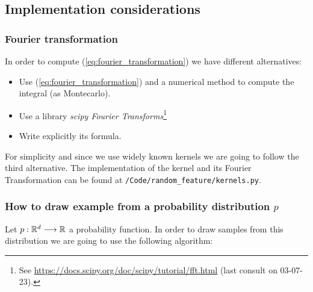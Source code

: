 \subsection{Implementation considerations}
\subsubsection{Fourier transformation}

In order to compute (\ref{eq:fourier_transformation})
we have different alternatives: 

\begin{itemize}
    \item Use (\ref{eq:fourier_transformation}) and a numerical method to compute the integral (as Montecarlo). 
    \item Use a library \textit{scipy Fourier Transforms}\footnote{
        See \url{https://docs.scipy.org/doc/scipy/tutorial/fft.html} (last consult on 03-07-23).
    }
    \item Write explicitly its formula. 
\end{itemize}

For simplicity and since we use widely known kernels we are going to follow the third alternative. 
The implementation of the kernel and its Fourier Transformation can be found at \texttt{/Code/random\_feature/kernels.py}. 

\subsubsection{How to draw example from a probability distribution $p$}

Let $p : \mathbb{R}^d \longrightarrow \mathbb{R}$ a probability function. In order to draw samples from this distribution 
we are going to use the following algorithm: 



